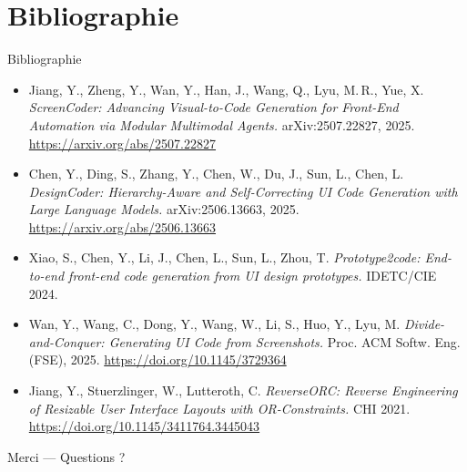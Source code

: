 \documentclass[10pt,aspectratio=169]{beamer}
\begin{document}
\section{Bibliographie}
\begin{frame}{Bibliographie}
\footnotesize
\begin{itemize}
  \item Jiang, Y., Zheng, Y., Wan, Y., Han, J., Wang, Q., Lyu, M.\,R., Yue, X. \emph{ScreenCoder: Advancing Visual-to-Code Generation for Front-End Automation via Modular Multimodal Agents.} arXiv:2507.22827, 2025. \url{https://arxiv.org/abs/2507.22827}
  \item Chen, Y., Ding, S., Zhang, Y., Chen, W., Du, J., Sun, L., Chen, L. \emph{DesignCoder: Hierarchy-Aware and Self-Correcting UI Code Generation with Large Language Models.} arXiv:2506.13663, 2025. \url{https://arxiv.org/abs/2506.13663}
  \item Xiao, S., Chen, Y., Li, J., Chen, L., Sun, L., Zhou, T. \emph{Prototype2code: End-to-end front-end code generation from UI design prototypes.} IDETC/CIE 2024.
  \item Wan, Y., Wang, C., Dong, Y., Wang, W., Li, S., Huo, Y., Lyu, M. \emph{Divide-and-Conquer: Generating UI Code from Screenshots.} Proc. ACM Softw. Eng. (FSE), 2025. \url{https://doi.org/10.1145/3729364}
  \item Jiang, Y., Stuerzlinger, W., Lutteroth, C. \emph{ReverseORC: Reverse Engineering of Resizable User Interface Layouts with OR-Constraints.} CHI 2021. \url{https://doi.org/10.1145/3411764.3445043}
\end{itemize}
\end{frame}

\begin{frame}
\centering
\Large Merci --- Questions ?
\end{frame}
\end{document}
